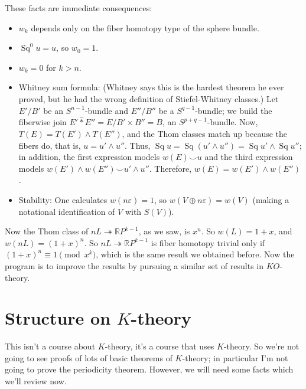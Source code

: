 \documentclass{article}
\newcommand{\OutputStructureOnKtheory}{}
\newcommand{\R}{\mathbb{R}}
\newcommand{\RP}{\R P}
\newcommand{\sprod}{\wedge}
\newcommand{\onto}{\twoheadrightarrow}
\DeclareMathOperator{\Sq}{Sq}
\begin{document}
These facts are immediate consequences:
\begin{itemize}
\item $w_k$ depends only on the fiber homotopy type of the sphere bundle.
\item $\Sq^0 u = u$, so $w_0 = 1$.
\item $w_k = 0$ for $k > n$.
\item Whitney sum formula: (Whitney says this is the hardest theorem he ever proved, but he had the wrong definition of Stiefel-Whitney classes.)  Let $E' / B'$ be an $S^{n-1}$-bundle and $E'' / B''$ be a $S^{q-1}$-bundle; we build the fiberwise join $E' \hat\ast E'' = E / B' \times B'' = B$, an $S^{p+q-1}$-bundle.  Now, $T(E) = T(E') \sprod T(E'')$, and the Thom classes match up because the fibers do, %
that is, $u = u' \sprod u''$.  Thus, $\Sq u = \Sq(u' \sprod u'') = \Sq u' \sprod \Sq u''$; in addition, the first expression models $w(E) \smile u$ and the third expression models $w(E') \sprod w(E'') \smile u' \sprod u''$.  Therefore, $w(E) = w(E') \sprod w(E'')$.
\item Stability: One calculates $w(n\varepsilon) = 1$, so $w(V \oplus n\varepsilon) = w(V)$ (making a notational identification of $V$ with $S(V)$).
\end{itemize}

Now the Thom class of $nL \onto \RP^{k-1}$, as we saw, is $x^n$.  So $w(L) = 1 + x$, and $w(nL) = (1+x)^n$.  So $nL \onto \RP^{k-1}$ is fiber homotopy trivial only if $(1+x)^n \equiv 1 \pmod{x^k}$, which is the same result we obtained before.  Now the program is to improve the results by pursuing a similar set of results in $KO$-theory.

\fi
\section{Structure on $K$-theory} %
\ifx\OutputStructureOnKtheory\undefined\else
This isn't a course about $K$-theory, it's a course that uses $K$-theory.  So we're not going to see proofs of lots of basic theorems of $K$-theory; in particular I'm not going to prove the periodicity theorem.  However, we will need some facts which we'll review now.
\end{document}
